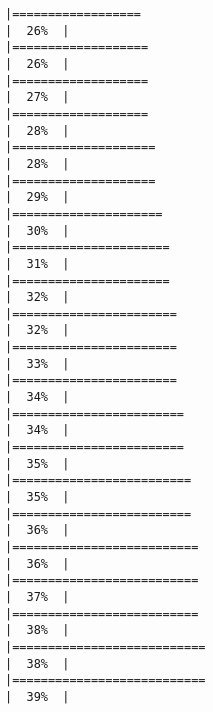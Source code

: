 \documentclass[
]{article}
\begin{document}
\begin{verbatim}
|==================                                                    |  26%  |                                                                              |===================                                                   |  26%  |                                                                              |===================                                                   |  27%  |                                                                              |===================                                                   |  28%  |                                                                              |====================                                                  |  28%  |                                                                              |====================                                                  |  29%  |                                                                              |=====================                                                 |  30%  |                                                                              |======================                                                |  31%  |                                                                              |======================                                                |  32%  |                                                                              |=======================                                               |  32%  |                                                                              |=======================                                               |  33%  |                                                                              |=======================                                               |  34%  |                                                                              |========================                                              |  34%  |                                                                              |========================                                              |  35%  |                                                                              |=========================                                             |  35%  |                                                                              |=========================                                             |  36%  |                                                                              |==========================                                            |  36%  |                                                                              |==========================                                            |  37%  |                                                                              |==========================                                            |  38%  |                                                                              |===========================                                           |  38%  |                                                                              |===========================                                           |  39%  |                                                                              
\end{verbatim}
\end{document}
